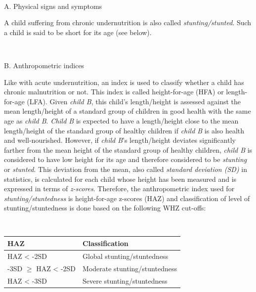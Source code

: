 \documentclass[12pt,]{book}
\theoremstyle{definition}
\theoremstyle{definition}
\theoremstyle{definition}
\theoremstyle{remark}
\begin{document}
~

A. Physical signs and symptoms

A child suffering from chronic undernutrition is also called
\emph{stunting/stunted}. Such a child is said to be short for its age
(see below).

~

B. Anthropometric indices

Like with acute undernutrition, an index is used to classify whether a
child has chronic malnutrition or not. This index is called
height-for-age (HFA) or length-for-age (LFA). Given \emph{child B}, this
child's length/height is assessed against the mean length/height of a
standard group of children in good health with the same age as
\emph{child B}. \emph{Child B} is expected to have a length/height close
to the mean length/height of the standard group of healthy children if
\emph{child B} is also health and well-nourished. However, if
\emph{child B}'s length/height deviates significantly farther from the
mean height of the standard group of healthy children, \emph{child B} is
considered to have low height for its age and therefore considered to be
\emph{stunting} or \emph{stunted}. This deviation from the mean, also
called \emph{standard deviation (SD)} in statistics, is calculated for
each child whose height has been measured and is expressed in terms of
\emph{z-scores}. Therefore, the anthropometric index used for
\emph{stunting/stuntedness} is height-for-age z-scores (HAZ) and
classification of level of stunting/stuntedness is done based on the
following WHZ cut-offs:

~

\begin{longtable}[]{@{}ll@{}}
\toprule
\begin{minipage}[b]{0.34\columnwidth}\raggedright
\textbf{HAZ}\strut
\end{minipage} & \begin{minipage}[b]{0.47\columnwidth}\raggedright
\textbf{Classification}\strut
\end{minipage}\tabularnewline
\midrule
\endhead
\begin{minipage}[t]{0.34\columnwidth}\raggedright
HAZ \textless{} -2SD\strut
\end{minipage} & \begin{minipage}[t]{0.47\columnwidth}\raggedright
Global stunting/stuntedness\strut
\end{minipage}\tabularnewline
\begin{minipage}[t]{0.34\columnwidth}\raggedright
-3SD \(\geq\) HAZ \textless{} -2SD\strut
\end{minipage} & \begin{minipage}[t]{0.47\columnwidth}\raggedright
Moderate stunting/stuntedness\strut
\end{minipage}\tabularnewline
\begin{minipage}[t]{0.34\columnwidth}\raggedright
HAZ \textless{} -3SD\strut
\end{minipage} & \begin{minipage}[t]{0.47\columnwidth}\raggedright
Severe stunting/stuntedness\strut
\end{minipage}\tabularnewline
\bottomrule
\end{longtable}
\end{document}
